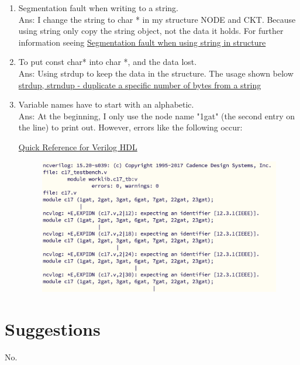 \documentclass{article}
\begin{document}
\begin{enumerate}
    \item Segmentation fault when writing to a string.\\
    Ans: I change the string to char * in my structure NODE and CKT. Because using string only copy the string object, not the data it holds.
For further information seeing   \href{https://stackoverflow.com/questions/47833332/segmentation-fault-when-using-string-in-structure}{Segmentation fault when using string in structure}


    \item To put const char* into char *, and the data lost.\\
    Ans: Using strdup to keep the data in the structure.
    The usage shown below    \href{https://pubs.opengroup.org/onlinepubs/9699919799/functions/strdup.html}{strdup, strndup - duplicate a specific number of bytes from a string}

    \item Variable names have to start with an alphabetic.\\
    Ans: At the beginning, I only use the node name "1gat" (the second entry on the line) to print out. However, errors like the following occur:

    \href{https://web.stanford.edu/class/ee183/handouts_win2003/VerilogQuickRef.pdf}{Quick
    Reference
    for
    Verilog HDL}

    \begin{figure}[H]
      \centering
    \includegraphics*[width=0.5\linewidth]{./img/2024-03-20-11-09-08.png}
    \end{figure}
    

\end{enumerate}


\section{Suggestions}

No.
\end{document}
